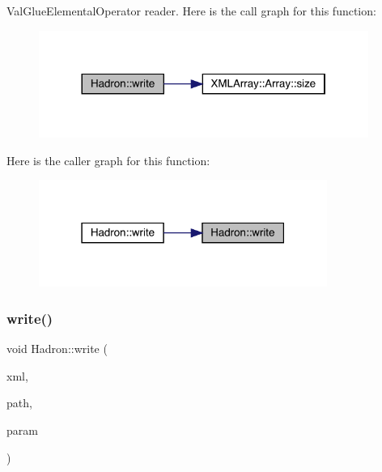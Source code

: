 Val\+Glue\+Elemental\+Operator reader. Here is the call graph for this function\+:
\nopagebreak
\begin{figure}[H]
\begin{center}
\leavevmode
\includegraphics[width=305pt]{d1/daf/namespaceHadron_aee7b5924c79af024abb8c3d99f7e8b34_cgraph}
\end{center}
\end{figure}
Here is the caller graph for this function\+:
\nopagebreak
\begin{figure}[H]
\begin{center}
\leavevmode
\includegraphics[width=267pt]{d1/daf/namespaceHadron_aee7b5924c79af024abb8c3d99f7e8b34_icgraph}
\end{center}
\end{figure}
\mbox{\label{namespaceHadron_aa7f9575393c93afa7db5f164da5c31eb}} 
\subsubsection{\texorpdfstring{write()}{write()}\hspace{0.1cm}{\footnotesize\ttfamily [66/95]}}
{\footnotesize\ttfamily void Hadron\+::write (\begin{DoxyParamCaption}\item[{\mbox{\hyperlink{classADATXML_1_1XMLWriter}{X\+M\+L\+Writer}} \&}]{xml,  }\item[{const std\+::string \&}]{path,  }\item[{const \mbox{\hyperlink{structHadron_1_1KeyHadronNode__t_1_1Quark__t}{Key\+Hadron\+Node\+\_\+t\+::\+Quark\+\_\+t}} \&}]{param }\end{DoxyParamCaption})}



